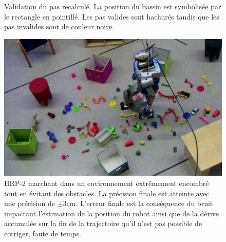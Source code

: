 \begin{figure}[ht!]
\begin{center}
  \end{center}
  \caption{Validation du pas recalculé. La position du bassin est
    symbolisée par le rectangle en pointillé. Les pas valides sont
    hachurés tandis que les pas invalides sont de couleur noire.
    \label{fig:stepvalid}}
\end{figure}


\begin{figure}
  \begin{center}
    \includegraphics[width=\textwidth]{src/chap2-suivi-trajectoire/demo.jpg}
  \end{center}
  \caption{HRP-2 marchant dans un environnement extrêmement encombré
    tout en évitant des obstacles. La précision finale est atteinte
    avec une précision de $\pm 3\mathrm{cm}$. L'erreur finale est la
    conséquence du bruit impactant l'estimation de la position du
    robot ainsi que de la dérive accumulée sur la fin de la
    trajectoire qu'il n'est pas possible de corriger, faute de
    temps. \label{fig:scenario}}
\end{figure}


